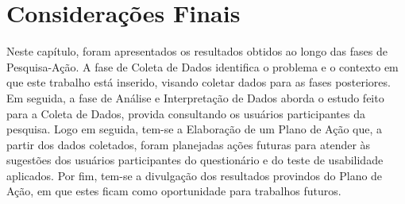 \section{Considerações Finais}
\label{sec:consideracoes_finais_analise}
Neste capítulo, foram apresentados os resultados obtidos ao longo das fases de Pesquisa-Ação. A fase de Coleta de Dados identifica o problema e o contexto em que este trabalho está inserido, visando coletar dados para as fases posteriores. Em seguida, a fase de Análise e Interpretação de Dados aborda o estudo feito para a Coleta de Dados, provida consultando os usuários participantes da pesquisa. Logo em seguida, tem-se a Elaboração de um Plano de Ação que, a partir dos dados coletados, foram planejadas ações futuras para atender às sugestões dos usuários participantes do questionário e do teste de usabilidade aplicados. Por fim, tem-se a divulgação dos resultados provindos do Plano de Ação, em que estes ficam como oportunidade para trabalhos futuros.
